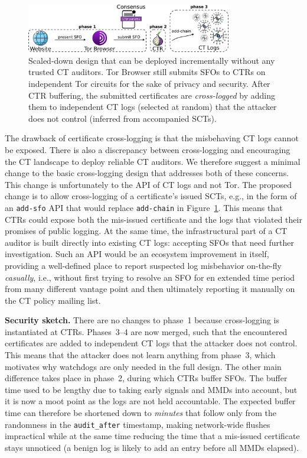 \begin{figure}
    \centering
	\includegraphics[width=0.8\textwidth]{img/design-ca}
	\vspace{-8px}
	\caption{%
		Scaled-down design that can be deployed incrementally without any
		trusted CT auditors.  Tor Browser still submits SFOs to CTRs on
		independent Tor circuits for the sake of privacy and security.  After
		CTR buffering, the submitted certificates are \emph{cross-logged} by
		adding them to independent CT logs (selected at random) that the
		attacker does not control (inferred from accompanied SCTs).
	}
	\label{fig:cross-log}
	\vspace{-10px}
\end{figure}

The drawback of certificate cross-logging is that the misbehaving CT logs cannot
be exposed.  There is also a discrepancy between cross-logging and encouraging
the CT landscape to deploy reliable CT auditors.  We therefore suggest a
minimal change to the basic cross-logging design that addresses both of these
concerns.  This change is unfortunately to the API of CT logs and not Tor.  The
proposed change is to allow cross-logging of a certificate's issued SCTs, e.g.,
in the form of an \texttt{add-sfo} API that would replace \texttt{add-chain}
in Figure~\ref{fig:cross-log}.
This means that CTRs could expose both the mis-issued certificate and the logs
that violated their promises of public logging.  At the same time, the
infrastructural part of a CT auditor is built directly into existing
CT logs:
	accepting SFOs that need further investigation.
Such an API would be an ecosystem improvement in itself, providing a
well-defined place to report suspected log misbehavior on-the-fly
\emph{casually}, i.e., without first trying to resolve an SFO for en extended
time period from many different vantage point and then ultimately reporting it
manually on the CT policy mailing list.

\textbf{Security sketch.} 
There are no changes to phase~1 because cross-logging is instantiated at CTRs.
Phases~3--4 are now merged, such that the encountered certificates are added to
independent CT logs that the attacker does not control.  This means that the
attacker does not learn anything from phase~3, which motivates why watchdogs are
only needed in the full design.  The other main difference takes place in
phase~2, during which CTRs buffer SFOs.  The buffer time used to be lengthy due
to taking early signals and MMDs into account, but it is now a moot point as the
logs are not held accountable.  The expected buffer time can therefore be
shortened down to \emph{minutes} that follow only from the randomness in the
\texttt{audit\_after} timestamp, making network-wide flushes impractical while
at the same time reducing the time that a mis-issued certificate stays unnoticed
(a benign log is likely to add an entry before all MMDs elapsed).

